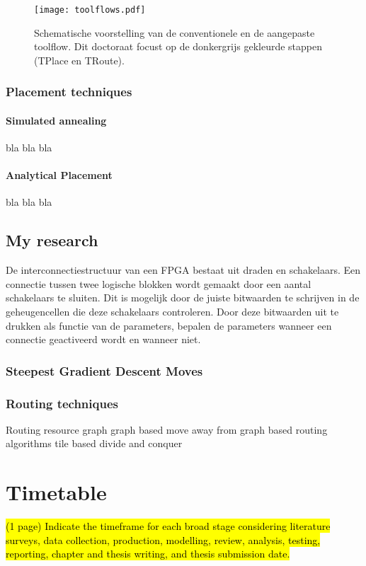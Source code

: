 \documentclass[a4paper,oneside,12pt]{article}
\begin{document}
\begin{figure}[ht]
\centering
\texttt{[image: toolflows.pdf]}
\caption{Schematische voorstelling van de conventionele en de aangepaste toolflow. Dit doctoraat focust op de donkergrijs gekleurde stappen (TPlace en TRoute).}
\label{toolflows}
\end{figure}

\subsubsection{Placement techniques}\label{rtr}


\paragraph{Simulated annealing}
bla bla bla

\paragraph{Analytical Placement}

bla bla bla

\subsection{My research}

De interconnectiestructuur van een FPGA bestaat uit draden en schakelaars. Een connectie tussen twee logische blokken wordt gemaakt door een aantal schakelaars te sluiten. Dit is mogelijk door de juiste bitwaarden te schrijven in de geheugencellen die deze schakelaars controleren. Door deze bitwaarden uit te drukken als functie van de parameters, bepalen de parameters wanneer een connectie geactiveerd wordt en wanneer niet.


\subsubsection{Steepest Gradient Descent Moves}\label{router}


\subsubsection{Routing techniques}\label{plaatser}

Routing resource graph
graph based
move away from graph based routing algorithms
tile based
divide and conquer

\newpage

\section{Timetable}\label{timetable}
\hl{(1 page)
Indicate the timeframe for each broad stage considering literature surveys, data collection, production, modelling, review, analysis,
testing, reporting, chapter and thesis writing, and thesis submission date.}
\end{document}
